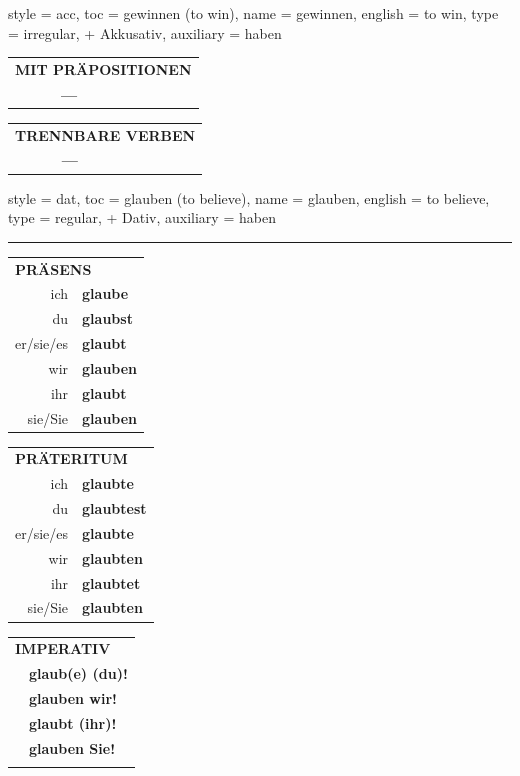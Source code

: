 \begin{verbentry}{
  style = {acc},
  toc = {gewinnen (to win)},
  name = {gewinnen},
  english = {to win},
  type = {irregular, + Akkusativ},
  auxiliary = {haben}
}
  
\vspace{10pt}

\begin{tabular}{lll}
\multicolumn{3}{l}{\textbf{MIT PRÄPOSITIONEN}}\\
& \textbf{---} & \\
\end{tabular}
\hfill
\begin{tabular}{lll}
\multicolumn{3}{l}{\textbf{TRENNBARE VERBEN}}\\
& \textbf{---} & \\
\end{tabular}
\vspace{-5pt}
\end{verbentry}

\begin{verbentry}{
  style = {dat},
  toc = {glauben (to believe)},
  name = {glauben},
  english = {to believe},
  type = {regular, + Dativ},
  auxiliary = {haben}
}
 
    
     \vspace{5pt}

    \hrule
    
    \vspace{5pt}

  \begin{tabular}{rl}
     \multicolumn{2}{l}{\textbf{PRÄSENS} }\\
    ich & \textbf{glaube}\\
    du & \textbf{glaubst}\\
    er/sie/es & \textbf{glaubt}\\
    wir & \textbf{glauben}\\
    ihr & \textbf{glaubt}\\
    sie/Sie & \textbf{glauben}\\
  \end{tabular}
  \hfill
     \begin{tabular}{rl}
    \multicolumn{2}{l}{\textbf{PRÄTERITUM} }\\
    ich & \textbf{glaubte}\\
    du & \textbf{glaubtest}\\
    er/sie/es & \textbf{glaubte}\\
    wir & \textbf{glaubten}\\
    ihr & \textbf{glaubtet}\\
    sie/Sie & \textbf{glaubten}\\
  \end{tabular}
  \hfill
  \begin{tabular}{rl}
     \multicolumn{2}{l}{\textbf{IMPERATIV} }\\
   & \textbf{glaub(e) (du)!}\\
   & \textbf{glauben wir!}\\
   & \textbf{glaubt (ihr)!}\\
   & \textbf{glauben Sie!}\\
   & \vspace{10pt}
  \end{tabular}


\end{verbentry}
